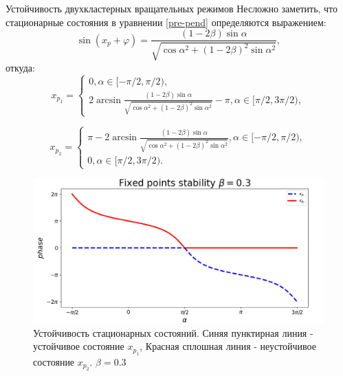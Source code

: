 \begin{chapter}{Устойчивость двухкластерных вращательных режимов}
	Несложно заметить, что стационарные состояния в уравнении \eqref{pre-pend} определяются выражением:
	$$
	\sin{(x_p + \varphi)} = \frac{(1 - 2\beta) \sin{\alpha}}{\sqrt{\cos{\alpha}^2 + (1 - 2\beta)^2\sin{\alpha}^2}},
	$$
	откуда:
	\begin{equation} \label{x1}
		x_{p_1} = \begin{cases}
			0, \alpha \in [-\pi/2, \pi/2), \\
			2\arcsin{\frac{(1 - 2\beta) \sin{\alpha}}{\sqrt{\cos{\alpha}^2 + (1 - 2\beta)^2\sin{\alpha}^2}}} - \pi , \alpha \in [\pi/2, 3\pi/2),
		\end{cases}
	\end{equation}
	
	\begin{equation} \label{x2}
	x_{p_2} = \begin{cases}
		\pi - 2\arcsin{\frac{(1 - 2\beta) \sin{\alpha}}{\sqrt{\cos{\alpha}^2 + (1 - 2\beta)^2\sin{\alpha}^2}}}, \alpha \in [-\pi/2, \pi/2), \\
		0, \alpha \in [\pi/2, 3\pi/2).
		\end{cases}
	\end{equation}
	\begin{figure}[h!]\center		
		\includegraphics[width=1\columnwidth]{pictures/fixed-points.png} 
		\caption{Устойчивость стационарных состояний.
		Синяя пунктирная линия - устойчивое состояние $x_{p_1}$,
		Красная сплошная линия - неустойчивое состояние $x_{p_2}$.
		$\beta = 0.3$}
		\label{fp-2}
	\end{figure}


\end{chapter}
